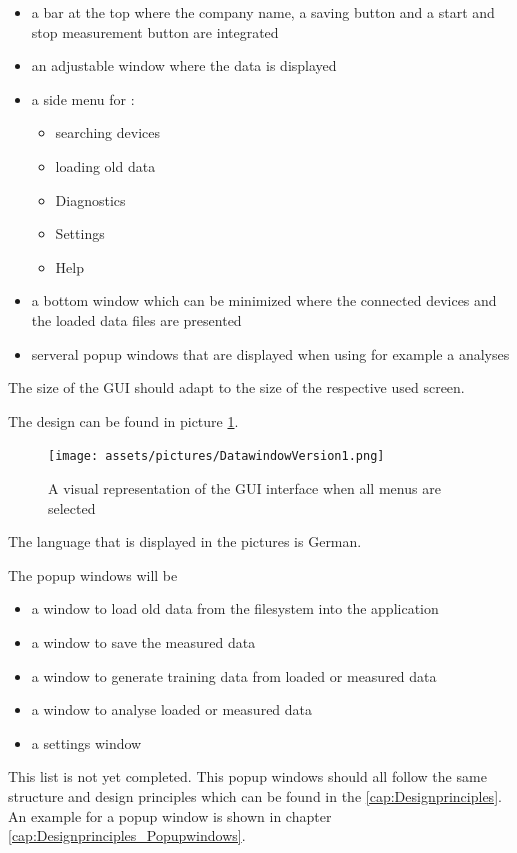 \documentclass{scrreprt}
\begin{document}
\begin{itemize}
    \item a bar at the top where the company name, a saving button and a start and stop measurement button are integrated 
    \item an adjustable window where the data is displayed
    \item a side menu for : 
    \begin{itemize}
        \item searching devices 
        \item loading old data 
        \item Diagnostics
        \item Settings
        \item Help
    \end{itemize}
    \item a bottom window which can be minimized where the connected devices and the loaded data files are presented 
    \item serveral popup windows that are displayed when using for example a analyses
\end{itemize}

The size of the GUI should adapt to the size of the respective used screen.

The design can be found in picture \ref{fig: GUI}. 
\begin{figure}[!h]
    \texttt{[image: assets/pictures/DatawindowVersion1.png]}
    \caption[]{A visual representation of the GUI interface when all menus are selected}
    \label{fig: GUI}
\end{figure}
The language that is displayed in the pictures is German.  


The popup windows will be 
\begin{itemize}
    \item a window to load old data from the filesystem into the application
    \item a window to save the measured data 
    \item a window to generate training data from loaded or measured data
    \item a window to analyse loaded or measured data 
    \item a settings window 
\end{itemize}
This list is not yet completed. 
This popup windows should all follow the same structure and design principles which can be found in the \ref{cap:Designprinciples}. 
An example for a popup window is shown in chapter \ref{cap:Designprinciples_Popupwindows}.
\end{document}
